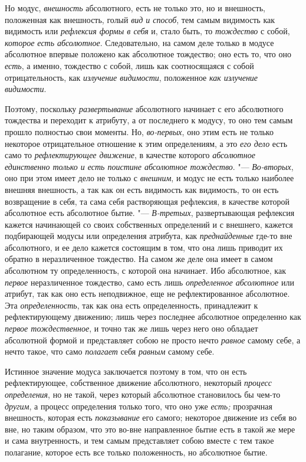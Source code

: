 Но модус, {\em внешность} абсолютного, есть не только
это, но и внешность, положенная как внешность, голый
{\em вид и способ}, тем самым видимость как видимость
или {\em рефлексия формы в себя} и, стало быть, то {\em тождество} с собой,
{\em которое есть абсолютное}. Следовательно, на самом
деле только в модусе абсолютное впервые положено как абсолютное тождество;
оно есть то, что оно {\em есть}, а именно, тождество с
собой, лишь как соотносящаяся с собой отрицательность, как
{\em излучение видимости}, положенное {\em как излучение видимости}.

Поэтому, поскольку {\em развертывание} абсолютного
начинает с его абсолютного тождества и переходит к атрибуту, а от
последнего к модусу, то оно тем самым прошло полностью свои моменты. Но,
{\em во-первых}, оно этим есть не только некоторое
отрицательное отношение к этим определениям, а это {\em его дело} есть само то
{\em рефлектирующее движение}, в качестве которого
{\em абсолютное единственно только и есть поистине
абсолютное тождество}. "--- {\em Во-вторых}, оно при этом
имеет дело не только с {\em внешним}, и модус не есть
только наиболее внешняя внешность, а так как он есть видимость как
видимость, то он есть возвращение в себя, та сама себя растворяющая
рефлексия, в качестве которой абсолютное есть абсолютное бытие. "---
{\em В-третьих}, развертывающая рефлексия кажется
начинающей со своих собственных определений и с внешнего, кажется
подбирающей модусы или определения атрибута, как
{\em преднайденные} где-то вне абсолютного, и ее дело
кажется состоящим в том, что она лишь приводит их обратно в неразличенное
тождество. На самом же деле она имеет в самом абсолютном ту определенность,
с которой она начинает. Ибо абсолютное, как
{\em первое} неразличенное тождество, само есть лишь
{\em определенное абсолютное} или атрибут, так как оно
есть неподвижное, еще не рефлектированное абсолютное. Эта
{\em определенность}, так как она есть определенность,
принадлежит к рефлектирующему движению; лишь через последнее абсолютное
определенно как {\em первое тождественное}, и точно так
же лишь через него оно обладает абсолютной формой и представляет собою не
просто нечто {\em равное} самому себе, а нечто такое,
что само {\em полагает} себя
{\em равным} самому себе.

Истинное значение модуса заключается поэтому в том, что он есть
рефлектирующее, собственное движение абсолютного, некоторый
{\em процесс определения}, но не такой, через который
абсолютное становилось бы чем-то {\em другим}, а
процесс определения только того, что оно уже
{\em есть;} прозрачная внешность, которая есть
{\em показывание} его самого; некоторое движение из
себя во вне, но таким образом, что это во-вне направленное бытие есть в
такой же мере и сама внутренность, и тем самым представляет собою вместе с
тем такое полагание, которое есть все только положенность, но абсолютное бытие.

